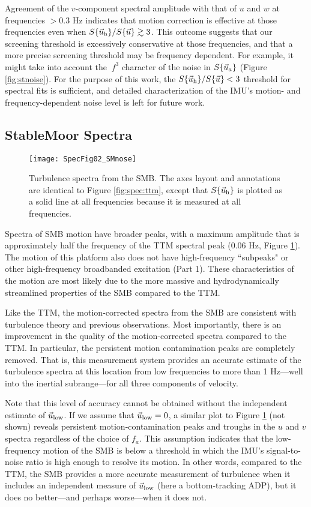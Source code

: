 Agreement of the $v$-component spectral amplitude with that of $u$ and $w$ at frequencies $>0.3$ Hz indicates that motion correction is effective at those frequencies even when $S\{\vec{u}_\mathrm{h}\}/S\{\vec{u}\} \gtrsim 3$. This outcome suggests that our screening threshold is excessively conservative at those frequencies, and that a more precise screening threshold may be frequency dependent. For example, it might take into account the $~f^3$ character of the noise in $S\{\vec{u}_a\}$ (Figure \ref{fig:stnoise}). For the purpose of this work, the $S\{\vec{u}_\mathrm{h}\}/S\{\vec{u}\} < 3$ threshold for spectral fits is sufficient, and detailed characterization of the IMU's motion- and frequency-dependent noise level is left for future work.

\subsection{StableMoor Spectra}

\begin{figure*}[th]
  \centering
  \texttt{[image: SpecFig02\_SMnose]}
  \caption{Turbulence spectra from the SMB. The axes layout and annotations are identical to Figure \ref{fig:spec:ttm}, except that $S\{\vec{u}_\mathrm{h}\}$ is plotted as a solid line at all frequencies because it is measured at all frequencies. }
  \label{fig:spec:sm}
\end{figure*}

Spectra of SMB motion have broader peaks, with a maximum amplitude that is approximately half the frequency of the TTM spectral peak (0.06 Hz, Figure \ref{fig:spec:sm}). The motion of this platform also does not have high-frequency ``subpeaks" or other high-frequency broadbanded excitation (Part 1).  These characteristics of the motion are most likely due to the more massive and hydrodynamically streamlined properties of the SMB compared to the TTM. 

Like the TTM, the motion-corrected spectra from the SMB are consistent with turbulence theory and previous observations. Most importantly, there is an improvement in the quality of the motion-corrected spectra compared to the TTM. In particular, the persistent motion contamination peaks are completely removed. That is, this measurement system provides an accurate estimate of the turbulence spectra at this location from low frequencies to more than 1 Hz---well into the inertial subrange---for all three components of velocity.

Note that this level of accuracy cannot be obtained without the independent estimate of $\vec{u}_\mathrm{low}$. If we assume that $\vec{u}_\mathrm{low}=0$, a similar plot to Figure \ref{fig:spec:sm} (not shown) reveals persistent motion-contamination peaks and troughs in the $u$ and $v$ spectra regardless of the choice of $f_a$. This assumption indicates that the low-frequency motion of the SMB is below a threshold in which the IMU's signal-to-noise ratio is high enough to resolve its motion. In other words, compared to the TTM, the SMB provides a more accurate measurement of turbulence when it includes an independent measure of $\vec{u}_\mathrm{low}$ (here a bottom-tracking ADP), but it does no better---and perhaps worse---when it does not.

